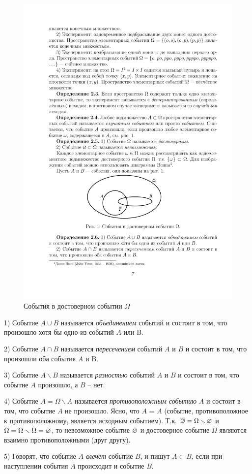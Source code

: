 \begin{figure}[h!]
	\centering
	\includegraphics[]{pic/pic1}
	\caption{События в достоверном событии $\Omega$}
	\label{fig1}
\end{figure}

\begin{definition}
	\label{def:2.6}
1) Событие $A \cup B$ называется \textit{объединением} событий и состоит в том, что произошло хотя бы одно из событий $A$ или B.

2) Событие $A\cap B$ называется \textit{пересечением} событий $A$ и $B$ и состоит в
том, что произошли оба события $A$ и B.

3) Событие $A\backslash B$ называется \textit{разностью} событий $A$ и $B$ и состоит в том,
что событие $A$ произошло, а $B$ -- нет.

4) Событие $\overline{A}=\Omega\backslash A$ называется \textit{противоположным событию} $A$ и состоит в том, что событие $A$ не произошло. Ясно, что $A$ = $A$ (событие, противоположное к противоположному, является исходным событием).
Т.к. $\overline{\varnothing}=\Omega\smallsetminus\varnothing$ и $\overline{\Omega}=\Omega\smallsetminus\Omega=\varnothing$, то невозможное событие $\varnothing$ и
достоверное событие $\Omega$ являются взаимно противоположными (друг другу).

5) Говорят, что событие $A$ \textit{влечёт} событие $B$, и пишут $A\subset B$, если при
наступлении события $A$ происходит и событие $B$.
\end{definition}


